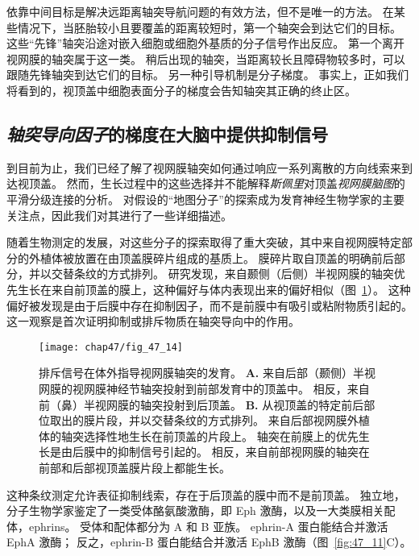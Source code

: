 依靠中间目标是解决远距离轴突导航问题的有效方法，但不是唯一的方法。
在某些情况下，当胚胎较小且要覆盖的距离较短时，第一个轴突会到达它们的目标。
这些“先锋”轴突沿途对嵌入细胞或细胞外基质的分子信号作出反应。
第一个离开视网膜的轴突属于这一类。
稍后出现的轴突，当距离较长且障碍物较多时，可以跟随先锋轴突到达它们的目标。
另一种引导机制是分子梯度。
事实上，正如我们将看到的，视顶盖中细胞表面分子的梯度会告知轴突其正确的终止区。



\subsection{\textit{轴突导向因子}的梯度在大脑中提供抑制信号}

到目前为止，我们已经了解了视网膜轴突如何通过响应一系列离散的方向线索来到达视顶盖。
然而，生长过程中的这些选择并不能解释\textit{斯佩里}对顶盖\textit{视网膜脑图}的平滑分级连接的分析。
对假设的“地图分子”的探索成为发育神经生物学家的主要关注点，因此我们对其进行了一些详细描述。


随着生物测定的发展，对这些分子的探索取得了重大突破，其中来自视网膜特定部分的外植体被放置在由顶盖膜碎片组成的基质上。
膜碎片取自顶盖的明确前后部分，并以交替条纹的方式排列。 
研究发现，来自颞侧（后侧）半视网膜的轴突优先生长在来自前顶盖的膜上，这种偏好与体内表现出来的偏好相似（图~\ref{fig:47_14}）。
这种偏好被发现是由于后膜中存在抑制因子，而不是前膜中有吸引或粘附物质引起的。
这一观察是首次证明抑制或排斥物质在轴突导向中的作用。


\begin{figure}[htbp]
	\centering
	\texttt{[image: chap47/fig\_47\_14]}
	\caption{排斥信号在体外指导视网膜轴突的发育。
		\textbf{A.} 来自后部（颞侧）半视网膜的视网膜神经节轴突投射到前部发育中的顶盖中。
		相反，来自前（鼻）半视网膜的轴突投射到后顶盖。
		\textbf{B.} 从视顶盖的特定前后部位取出的膜片段，并以交替条纹的方式排列。
		来自后部视网膜外植体的轴突选择性地生长在前顶盖的片段上。
		轴突在前膜上的优先生长是由后膜中的抑制信号引起的。
		相反，来自前部视网膜的轴突在前部和后部视顶盖膜片段上都能生长\cite{walter1987avoidance}。}
	\label{fig:47_14}
\end{figure}


这种条纹测定允许表征抑制线索，存在于后顶盖的膜中而不是前顶盖。
独立地，分子生物学家鉴定了一类受体酪氨酸激酶，即 Eph 激酶，以及一大类膜相关配体，ephrins。
受体和配体都分为 A 和 B 亚族。
ephrin-A 蛋白能结合并激活 EphA 激酶；
反之，ephrin-B 蛋白能结合并激活 EphB 激酶（图~\ref{fig:47_11}C）。



